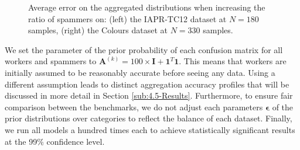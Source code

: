 \documentclass{article}
\begin{document}
\begin{figure}[t]
\begin{centering}
\hfill{}
\par\end{centering}

\protect\caption{\label{fig:error_vs_spammers}Average error on the aggregated distributions
when increasing the ratio of spammers on: (left) the IAPR-TC12 dataset
at $N=180$ samples, (right) the Colours dataset at $N=330$ samples.}
\end{figure}








\textbf{}We set the parameter of the prior probability of each
confusion matrix for all workers and spammers to $\mathbf{A}^{(k)}=100\times\mathbf{I}+\mathbf{1}^{T}\mathbf{1}$.
This means that workers are initially assumed to be reasonably accurate
before seeing any data. Using a different assumption leads to distinct
aggregation accuracy profiles that will be discussed in more detail
in Section \ref{sub:4.5-Results}. Furthermore, to ensure fair comparison
between the benchmarks, we do not adjust each parameters $\boldsymbol{\epsilon}$
of the prior distributions over categories to reflect the balance
of each dataset.\textbf{} Finally, we run all models a hundred
times each to achieve statistically significant results at the 99\%
confidence level.
\end{document}
